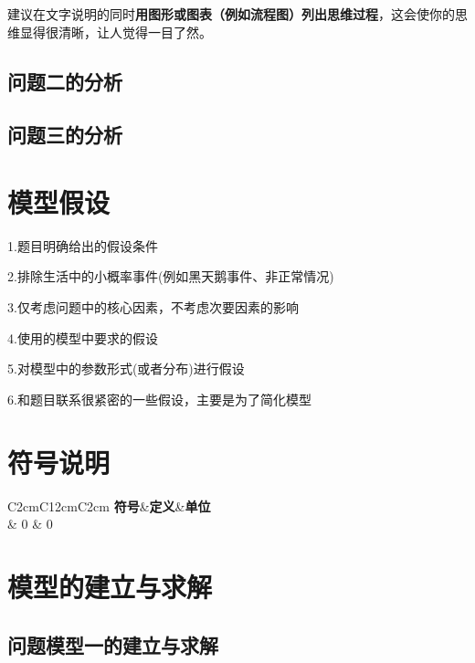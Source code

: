 \documentclass[a4paper,10.5pt]{ctexart}
\begin{document}
建议在文字说明的同时{\bf 用图形或图表（例如流程图）列出思维过程}，这会使你的思维显得很清晰，让人觉得一目了然。
\subsection{问题二的分析}

\subsection{问题三的分析}

\section{模型假设}

\par 1.题目明确给出的假设条件

2.排除生活中的小概率事件(例如黑天鹅事件、非正常情况)

3.仅考虑问题中的核心因素，不考虑次要因素的影响

4.使用的模型中要求的假设

5.对模型中的参数形式(或者分布)进行假设

6.和题目联系很紧密的一些假设，主要是为了简化模型
\section{符号说明}

\begin{longtable}[h]
\centering
\begin{tabular}{C{2cm}C{12cm}C{2cm}}
\toprule[2pt]
\textbf {符号}&\textbf {定义}&\textbf {单位}\\         & 0            &   0\\
\bottomrule[2pt]
\end{tabular}
\label{tab:wei1}
\end{longtable}

\section{模型的建立与求解}
\subsection{问题模型一的建立与求解}
\end{document}
